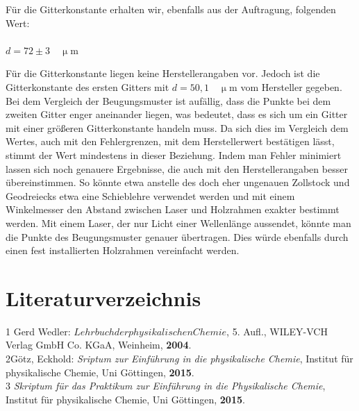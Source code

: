 \documentclass[12pt,a4paper,titlepage,headinclude,bibtotoc]{scrartcl}
\begin{document}
Für die Gitterkonstante erhalten wir, ebenfalls aus der Auftragung, folgenden Wert:\\\\
\centering
$ d = 72 \pm 3 \quad \mathrm{\upmu m} $\\

\begin{flushleft}
Für die Gitterkonstante liegen keine Herstellerangaben vor. Jedoch ist die Gitterkonstante des ersten Gitters mit $d = 50,1 \quad \mathrm{\upmu m} $ vom Hersteller gegeben. Bei dem Vergleich der Beugungsmuster ist aufällig, dass die Punkte bei dem zweiten Gitter enger aneinander liegen, was bedeutet, dass es sich um ein Gitter mit einer größeren Gitterkonstante handeln muss. Da sich dies im Vergleich dem Wertes, auch mit den Fehlergrenzen, mit dem Herstellerwert bestätigen lässt, stimmt der Wert mindestens in dieser Beziehung.
\vspace{1cm}
Indem man Fehler minimiert lassen sich noch genauere Ergebnisse, die auch mit den Herstellerangaben besser übereinstimmen. So könnte etwa anstelle des doch eher ungenauen Zollstock und Geodreiecks etwa eine Schieblehre verwendet werden und mit einem Winkelmesser den Abstand zwischen Laser und Holzrahmen exakter bestimmt werden. Mit einem Laser, der nur Licht einer Wellenlänge aussendet, könnte man die Punkte des Beugungsmuster genauer übertragen. Dies würde ebenfalls durch einen fest installierten Holzrahmen vereinfacht werden.
\end{flushleft}

\section{Literaturverzeichnis}
\begin{flushleft}
1 \quad Gerd Wedler: $Lehrbuch der physikalischen Chemie$, 5. Aufl., WILEY-VCH Verlag GmbH Co. KGaA, Weinheim, \textbf{2004}.\\
\vspace{0,5 cm}
2\quad Götz, Eckhold: \emph{Sriptum zur Einführung in die physikalische Chemie}, Institut für physikalische Chemie, Uni Göttingen, \textbf{2015}.\\
\vspace{0,5 cm}
3 \quad \emph{Skriptum für das Praktikum zur Einführung in die Physikalische Chemie}, Institut für physikalische Chemie, Uni Göttingen, \textbf{2015}.\\
\end{flushleft}
\end{document}
